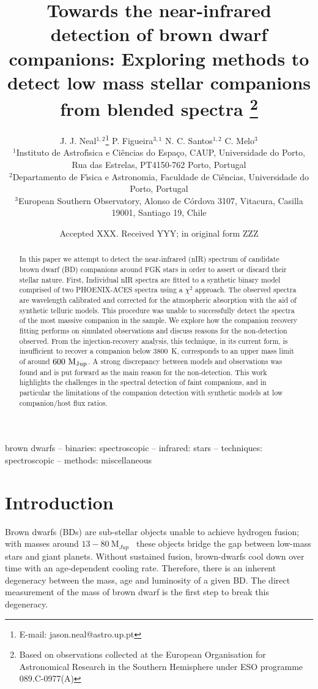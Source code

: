 \documentclass[fleqn,usenatbib]{mnras}
\title[Towards the nIR detection of BD companions]{Towards the near-infrared detection of brown dwarf companions: Exploring methods to detect low mass stellar companions from blended spectra \thanks{Based on observations collected at the European Organisation for Astronomical Research in the Southern Hemisphere under ESO programme 089.C-0977(A)}}
\author[J. J. Neal et al.]{
    J. J. Neal$^{1,2}$\thanks{E-mail: jason.neal@astro.up.pt}
    P. Figueira$^{3,1}$
    N. C. Santos$^{1,2}$
    C. Melo$^{3}$
    \\
    $^{1}$Instituto de Astrof\'{\i}sica e Ci\^encias do Espa\c{c}o, CAUP, Universidade do Porto, Rua das Estrelas, PT4150-762 Porto, Portugal\\
    $^{2}$Departamento de F\'{\i}sica e Astronomia, Faculdade de Ci\^{e}ncias, Universidade do Porto, Portugal\\
    $^{3}$European Southern Observatory, Alonso de C\'{o}rdova 3107, Vitacura, Casilla 19001, Santiago 19, Chile\\
}
\date{Accepted XXX. Received YYY; in original form ZZZ}
\newcommand*\bl{\color{blue}}
\begin{document}
    \label{firstpage}
    \pagerange{\pageref{firstpage}--\pageref{lastpage}}
    \maketitle
    
    \begin{abstract}
        {\bl In this paper we attempt to detect the near-infrared (nIR) spectrum of candidate brown dwarf (BD) companions around FGK stars in order to assert or discard their stellar nature. First, Individual nIR spectra are fitted to a synthetic binary model comprised of two PHOENIX-ACES spectra using a $\chi^2$ approach. The observed spectra are wavelength calibrated and corrected for the atmospheric absorption with the aid of synthetic telluric models. This procedure was unable to successfully detect the spectra of the most massive companion in the sample. We explore how the companion recovery fitting performs on simulated observations and discuss reasons for the non-detection observed. From the injection-recovery analysis, this technique, in its current form, is insufficient to recover a companion below 3800~K, corresponds to an upper mass limit of around \(\rm 600~M_{Jup}\). A strong discrepancy between models and observations was found and is put forward as the main reason for the non-detection. This work highlights the challenges in the spectral detection of faint companions, and in particular the limitations of the companion detection with synthetic models at low companion/host flux ratios.}
        
    \end{abstract}
    
    \begin{keywords}
        brown dwarfs -- binaries: spectroscopic -- infrared: stars -- techniques: spectroscopic -- methods: miscellaneous
    \end{keywords}
    
    
    \section{Introduction}
    \label{sec:intro}
    Brown dwarfs (BDs) are sub-stellar objects unable to achieve hydrogen fusion; with masses around \(13-80~\textrm{M}_{Jup}\)~\citep{chabrier_theory_2000} these objects bridge the gap between low-mass stars and giant planets. Without sustained fusion, brown-dwarfs cool down over time with an age-dependent cooling rate. Therefore, there is an inherent degeneracy between the mass, age and luminosity of a given BD\citep{burrows_nongray_1997}. {\bl The direct measurement of the mass of brown dwarf is the first step to break this degeneracy.}
    
\end{document}

